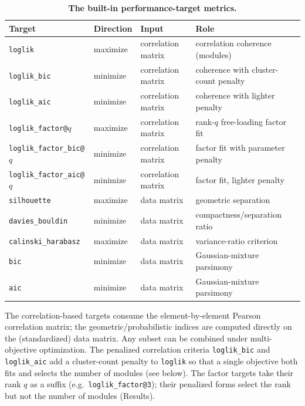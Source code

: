 \begin{table}[!ht]
\centering
\caption{\textbf{The built-in performance-target metrics.}}
\label{tab:metrics}
\begin{tabular}{@{}llll@{}}
\hline
Target & Direction & Input & Role \\
\hline
\texttt{loglik}            & maximize & correlation matrix & correlation coherence (modules) \\
\texttt{loglik\_bic}       & minimize & correlation matrix & coherence with cluster-count penalty \\
\texttt{loglik\_aic}       & minimize & correlation matrix & coherence with lighter penalty \\
\texttt{loglik\_factor@}$q$ & maximize & correlation matrix & rank-$q$ free-loading factor fit \\
\texttt{loglik\_factor\_bic@}$q$ & minimize & correlation matrix & factor fit with parameter penalty \\
\texttt{loglik\_factor\_aic@}$q$ & minimize & correlation matrix & factor fit, lighter penalty \\
\texttt{silhouette}        & maximize & data matrix        & geometric separation \\
\texttt{davies\_bouldin}   & minimize & data matrix        & compactness/separation ratio \\
\texttt{calinski\_harabasz}& maximize & data matrix        & variance-ratio criterion \\
\texttt{bic}               & minimize & data matrix        & Gaussian-mixture parsimony \\
\texttt{aic}               & minimize & data matrix        & Gaussian-mixture parsimony \\
\hline
\end{tabular}
\begin{flushleft}
The correlation-based targets consume the element-by-element Pearson correlation
matrix; the geometric/probabilistic indices are computed directly on the
(standardized) data matrix. Any subset can be combined under multi-objective
optimization. The penalized correlation criteria \texttt{loglik\_bic} and
\texttt{loglik\_aic} add a cluster-count penalty to \texttt{loglik} so that a
single objective both fits and selects the number of modules (see below). The factor targets take their rank $q$ as a suffix (e.g.\ \texttt{loglik\_factor@3}); their penalized forms select the rank but not the number of modules (Results).
\end{flushleft}
\end{table}

